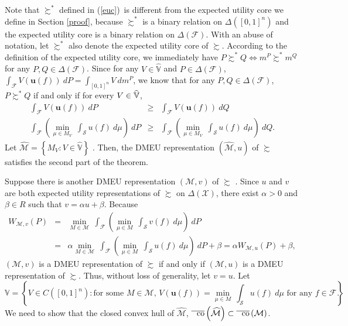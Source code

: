 \documentclass[12pt, notitlepage]{article}
\begin{document}
Note that $\succsim ^{\ast }$ defined in (\ref{euc})\ is different from the
expected utility core we define in Section \ref{proof}, because $\succsim
^{\ast }$ is a binary relation on $\Delta ([0,1]^{n})$ and the expected
utility core is a binary relation on $\Delta (\mathcal{F})$. With an abuse
of notation, let $\succsim ^{\ast }$ also denote the expected utility core
of $\succsim $. According to the definition of the expected utility core, we
immediately have $P\succsim ^{\ast }Q\iff m^{P}\succsim ^{\ast }m^{Q}$ for
any $P,Q\in \Delta (\mathcal{F})$. Since for any $V\in \widehat{\mathbb{V}}$
and $P\in \Delta (\mathcal{F})$, $\int_{\mathcal{F}}V(\mathbf{u}%
(f))~dP=\int_{[0,1]^{n}}V~dm^{P}$, we know that for any $P,Q\in \Delta (%
\mathcal{F})$, $P\succsim ^{\ast }Q$ if and only if for every $V\in \widehat{%
\mathbb{V}}$,%
\begin{eqnarray*}
\int_{\mathcal{F}}V(\mathbf{u}(f))~dP &\geq &\int_{\mathcal{F}}V(\mathbf{u}%
(f))~dQ \\
\int_{\mathcal{F}}\left( \underset{\mu \in M_{V}}{\min }~\int_{\mathcal{S}%
}u(f)~d\mu \right) ~dP &\geq &\int_{\mathcal{F}}\left( \underset{\mu \in
M_{V}}{\min }~\int_{\mathcal{S}}u(f)~d\mu \right) ~dQ.
\end{eqnarray*}%
Let $\widehat{\mathcal{M}}=\left\{ M_{V}:V\in \widehat{\mathbb{V}}\right\} $%
. Then, the DMEU representation $\left( \widehat{\mathcal{M}},u\right) $ of $%
\succsim $ satisfies the second part of the theorem.

Suppose there is another DMEU representation $(\mathcal{M},v)$ of $\succsim $%
. Since $u$ and $v$ are both expected utility representations of $\succsim $
on $\Delta (\mathcal{X})$, there exist $\alpha >0$ and $\beta \in R$ such
that $v=\alpha u+\beta $. Because%
\begin{eqnarray*}
W_{\mathcal{M},v}(P) &=&\min_{M\in \mathcal{M}}~\int_{\mathcal{F}}\left( 
\underset{\mu \in M}{\min }~\int_{\mathcal{S}}v(f)~d\mu \right) ~dP \\
&=&\alpha \min_{M\in \mathcal{M}}~\int_{\mathcal{F}}\left( \underset{\mu \in
M}{\min }~\int_{\mathcal{S}}u(f)~d\mu \right) ~dP+\beta =\alpha W_{\mathcal{M%
},u}(P)+\beta ,
\end{eqnarray*}%
$(\mathcal{M},v)$ is a DMEU representation of $\succsim $ if and only if $(%
\mathcal{M},u)$ is a DMEU representation of $\succsim $. Thus, without loss
of generality, let $v=u$. Let%
\begin{equation*}
\mathbb{V}=\left\{ V\in C([0,1]^{n}):\text{for some }M\in \mathcal{M}\text{, 
}V(\mathbf{u}(f))=\underset{\mu \in M}{\min }~\int_{\mathcal{S}}u(f)~d\mu 
\text{ for any }f\in \mathcal{F}\right\} .
\end{equation*}
{We need to show that the closed convex hull of }$\widehat{\mathcal{M}}$, $%
\overline{\text{co}}\left( \widehat{\mathcal{M}}\right) \subset \overline{%
\text{co}}\left( \mathcal{M}\right) $.
\end{document}
